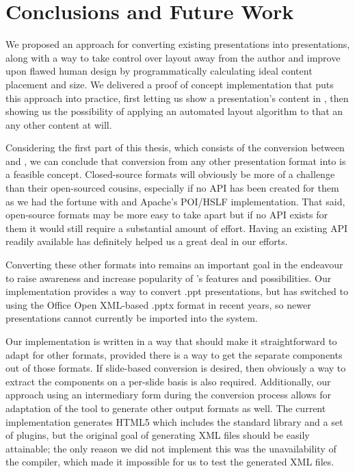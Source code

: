 
 \chapter{Conclusions and Future Work}


  We proposed an approach for converting existing \ppt presentations into \mxp
  presentations, along with a way to take control over layout away from the
  author and improve upon flawed human design by programmatically calculating
  ideal content placement and size. We delivered a proof of concept
  implementation that puts this approach into practice, first letting us show a
  \ppt presentation's content in \mxp, then showing us the possibility of
  applying an automated layout algorithm to that an any other \mxp content at
  will.

  Considering the first part of this thesis, which consists of the conversion
  between \ppt and \mxp, we can conclude that conversion from any other
  presentation format into \mxp is a feasible concept. Closed-source formats
  will obviously be more of a challenge than their open-sourced cousins,
  especially if no API has been created for them as we had the fortune with
  \ppt and Apache's POI/HSLF implementation. That said, open-source formats may
  be more easy to take apart but if no API exists for them it would still
  require a substantial amount of effort. Having an existing API readily
  available has definitely helped us a great deal in our efforts.

  Converting these other formats into \mxp remains an important goal in the
  endeavour to raise awareness and increase popularity of \mxp's features and
  possibilities. Our implementation provides a way to convert \ppt .ppt
  presentations, but \ppt* has switched to using the Office Open XML-based
  .pptx format in recent years, so newer \ppt presentations cannot currently be
  imported into the \mxp system.

  Our implementation is written in a way that should make it straightforward to
  adapt for other formats, provided there is a way to get the separate
  components out of those formats. If slide-based conversion is desired, then
  obviously a way to extract the components on a per-slide basis is also
  required. Additionally, our approach using an intermediary form during the
  conversion process allows for adaptation of the tool to generate other output
  formats as well. The current implementation generates HTML5 which includes
  the \mxp standard library and a set of plugins, but the original goal of
  generating \mxp XML files should be easily attainable; the only reason we did
  not implement this was the unavailability of the \mxp compiler, which made it
  impossible for us to test the generated XML files.

